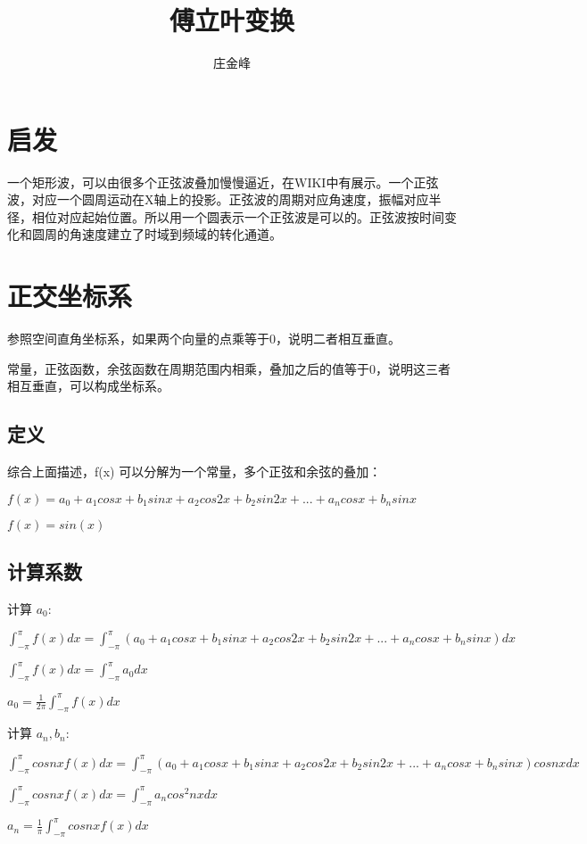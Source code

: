 \documentclass{article}
\title{傅立叶变换}
\author{庄金峰}
\begin{document}
\maketitle

\section{启发}

一个矩形波，可以由很多个正弦波叠加慢慢逼近，在WIKI中有展示。一个正弦波，对应一个圆周运动在X轴上的投影。正弦波的周期对应角速度，振幅对应半径，相位对应起始位置。所以用一个圆表示一个正弦波是可以的。正弦波按时间变化和圆周的角速度建立了时域到频域的转化通道。

\section{正交坐标系}

参照空间直角坐标系，如果两个向量的点乘等于0，说明二者相互垂直。

常量，正弦函数，余弦函数在周期范围内相乘，叠加之后的值等于0，说明这三者相互垂直，可以构成坐标系。

\subsection{定义}

综合上面描述，f(x) 可以分解为一个常量，多个正弦和余弦的叠加：

$f(x) = a_{0} + a_{1}cosx + b_{1}sinx + a_{2}cos2x + b_{2}sin2x + ... + a_{n}cosx + b_{n}sinx$

$f(x) = sin(x)$

\subsection{计算系数}

计算 $a_{0}$:

$\int_{-\pi}^{\pi} f(x)dx = \int_{-\pi}^{\pi} (a_{0} + a_{1}cosx + b_{1}sinx + a_{2}cos2x + b_{2}sin2x + ... + a_{n}cosx + b_{n}sinx) dx$

$\int_{-\pi}^{\pi} f(x)dx = \int_{-\pi}^{\pi} a_{0} dx$

$a_{0} = \frac{1}{2\pi} \int_{-\pi}^{\pi} f(x) dx$

计算 $a_{n}, b_{n}$:

$\int_{-\pi}^{\pi} cos nx f(x)dx = \int_{-\pi}^{\pi} (a_{0} + a_{1}cosx + b_{1}sinx + a_{2}cos2x + b_{2}sin2x + ... + a_{n}cosx + b_{n}sinx) cosnx dx$

$\int_{-\pi}^{\pi} cos nx f(x)dx = \int_{-\pi}^{\pi} a_{n}cos^2nxdx$

$a_{n} = \frac{1}{\pi} \int_{-\pi}^{\pi} cosnx f(x) dx$
\end{document}
